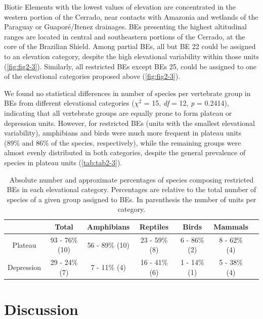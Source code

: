 \documentclass[12pt,openright,oneside,a4paper,english]{abntex2}
\begin{document}
Biotic Elements with the lowest values of elevation are concentrated in the western portion of the Cerrado, near contacts with Amazonia and wetlands of the Paraguay or Guaporé/Itenez drainages. BEs presenting the highest altitudinal ranges are located in central and southeastern portions of the Cerrado, at the core of the Brazilian Shield. Among partial BEs, all but BE 22 could be assigned to an elevation category, despite the high elevational variability within those units (\autoref{fig:fig2-3}). Similarly, all restricted BEs except BEs 25, could be assigned to one of the elevational categories proposed above (\autoref{fig:fig2-3}).

We found no statistical differences in number of species per vertebrate group in BEs from different elevational categories ($\chi^2$ = 15, \textit{df} = 12, \textit{p} = 0.2414), indicating that all vertebrate groups are equally prone to form plateau or depression units. However, for restricted BEs (units with the smallest elevational variability), amphibians and birds were much more frequent in plateau units (89\% and 86\% of the species, respectively), while the remaining groups were almost evenly distributed in both categories, despite the general prevalence of species in plateau units (\autoref{tab:tab2-3}).

\begin{table}
	\centering
	\caption[Terrestrial vertebrate classes proportion in Biotic Elements (BEs) elevational categories]{\small Absolute number and approximate percentages of species composing restricted BEs in each elevational category. Percentages are relative to the total number of species of a given group assigned to BEs. In parenthesis the number of units per category.}
	\label{tab:tab2-3}
	\vspace{\bigskipamount}
	\footnotesize
	\begin{tabular}{c c c c c c c}
		\hline
		& Total & Amphibians & Reptiles & Birds & Mammals\\
		\hline
		Plateau & 93 - 76\% (10) & 56 - 89\% (10) & 23 - 59\% (8) & 6 - 86\% (2) & 8 - 62\% (4)\\
		Depression & 29 - 24\% (7) & 7 - 11\% (4) & 16 - 41\% (6) & 1 - 14\% (1) & 5 - 38\% (4)\\
		\hline
	\end{tabular}
\end{table}

\section{Discussion}
\end{document}
